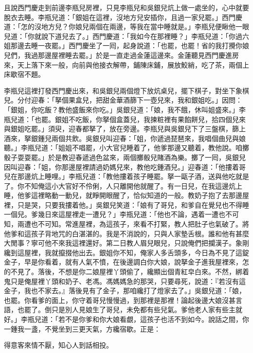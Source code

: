 且說西門慶走到前邊李瓶兒房裡，只見李瓶兒和吳銀兒炕上做一處坐的，心中就要脫衣去睡。李瓶兒道：「銀姐在這裡，沒地方兒安插你，且過一家兒罷。」西門慶道：「怎的沒地方兒？你娘兒兩個在兩邊，等我在當中睡就是。」李瓶兒便瞅他一眼兒道：「你就說下道兒去了。」西門慶道：「我如今在那裡睡？」李瓶兒道：「你過六姐那邊去睡一夜罷。」西門慶坐了一囘，起身說道：「也罷，也罷！省的我打攪你娘兒們，我過那邊屋裡睡去罷。」於是一直走過金蓮這邊來。金蓮聽見西門慶進房來，天上落下來一般，向前與他接衣解帶，鋪陳床鋪，展放鮫綃，吃了茶，兩個上床歇宿不題。

李瓶兒這裡打發西門慶出來，和吳銀兒兩個燈下放炕桌兒，擺下棋子，對坐下象棋兒。分付迎春：「拏個果盒兒，把甜金華酒篩下一壺兒來，我和銀姐吃。」因問：「銀姐，你吃飯？教他盛飯來你吃。」吳銀兒道：「娘，我不餓，休叫姐盛來。」李瓶兒道：「也罷。銀姐不吃飯，你拏個盒蓋兒，我揀粧裡有果餡餅兒，拾四個兒來與銀姐吃罷。」須臾，迎春都拏了，放在旁邊。李瓶兒與吳銀兒下了三盤棋，篩上酒來，拏銀鍾兒兩個共飲。吳銀兒叫迎春：「姐，你遞過琵琶來，我唱個曲兒與娘聽。」李瓶兒道：「姐姐不唱罷，小大官兒睡着了，他爹那邊又聽着，教他說。咱擲骰子耍耍罷。」於是教迎春遞過色盆來，兩個擲骰兒賭酒為樂。擲了一囘，吳銀兒因叫迎春：「姐，你那邊屋裡請過奶媽兒來，教他吃鍾酒兒。」迎春道：「他摟着哥兒在那邊炕上睡哩。」李瓶兒道：「教他摟着孩子睡罷。拏一甌子酒，送與他吃就是了。你不知俺這小大官好不伶俐，人只離開他就醒了。有一日兒，在我這邊炕上睡，他爹這裡略動一動兒，就睜開眼醒了，恰似知道的一般。教奶子抱了去那邊屋裡，只是哭，只要我摟着他。」吳銀兒笑道：「娘有了哥兒，和爹自在覺兒也不得睡一個兒。爹幾日來這屋裡走一遭兒？」李瓶兒道：「他也不論，遇着一遭也不可知，兩遭也不可知。常進屋裡，為這孩子，來看不打緊，教人把肚子也氣破了。將他爹和這孩子背地咒的白湛湛的。我是不消說的，只與人家墊舌根。誰和他有甚麼大閒事？寧可他不來我這裡還好。第二日教人眉兒眼兒，只說俺們把攔漢子。象剛纔到這屋裡，我就攛掇他出去。銀姐你不知，俺家人多舌頭多，今日為不見了這錠金子，早是你看着，就有人氣不憤，在後邊調白你大娘，說拏金子進我屋裡來，怎的不見了。落後，不想是你二娘屋裡丫頭偷了，纔顯出個青紅皁白來。不然，綁着鬼只是俺屋裡丫頭和奶子、老馮。馮媽媽急的那哭，只要尋死，說道：『若沒有這金子，我也不家去。』落後見有了金子，那咱纔打了燈家去了。」吳銀兒道：「娘，也罷。你看爹的面上，你守着哥兒慢慢過，到那裡是那裡！論起後邊大娘沒甚言語，也罷了。倒只是別人見娘生了哥兒，未免都有些兒氣。爹他老人家有些主就好。」李瓶兒道：「若不是你爹和你大娘看覷，這孩子也活不到如今。說話之間，你一鍾我一盞，不覺坐到三更天氣，方纔宿歇。正是：

\begin{myquote}
得意客來情不厭，知心人到話相投。
\end{myquote}

